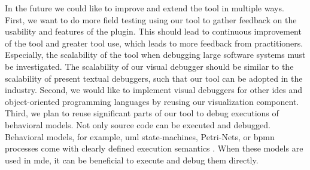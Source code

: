 \documentclass[conference]{IEEEtran}
\begin{document}
In the future we could like to improve and extend the tool in multiple ways.
First, we want to do more field testing using our tool to gather feedback on the usability and features of the plugin.
This should lead to continuous improvement of the tool and greater tool use, which leads to more feedback from practitioners. 
Especially, the scalability of the tool when debugging large software systems must be investigated.
The scalability of our visual debugger should be similar to the scalability of present textual debuggers, such that our tool can be adopted in the industry.
Second, we would like to implement visual debuggers for other \glspl*{ide} and object-oriented programming languages by reusing our visualization component.
Third, we plan to reuse significant parts of our tool to debug executions of behavioral models.
Not only source code can be executed and debugged.
Behavioral models, for example, \gls*{uml} state-machines, Petri-Nets, or \gls{bpmn} processes come with clearly defined execution semantics \cite{krauterBehavioralConsistencyHeterogeneous2021}.
When these models are used in \gls*{mde}, it can be beneficial to execute and debug them directly.



\newpage



\end{document}
